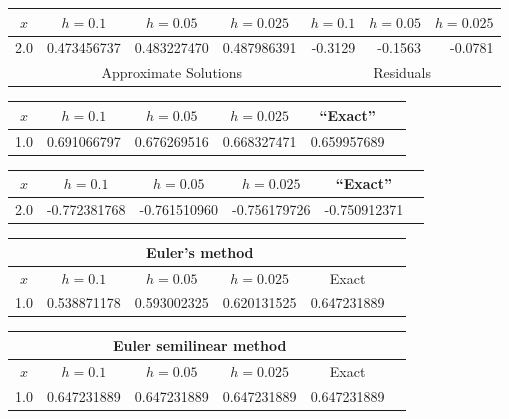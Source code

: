 \bigskip

 \quad
{\small
\begin{tabular}{|c|r|r|r|r|r|r|}\hline
\multicolumn{1}{|c|}{$x$}&
\multicolumn{1}{|c|}{$h=0.1$}&
\multicolumn{1}{|c|}{$h=0.05$}&
\multicolumn{1}{|c|}{$h=0.025$}&
\multicolumn{1}{|c|}{$h=0.1$}&
\multicolumn{1}{|c|}{$h=0.05$}&
\multicolumn{1}{|c|}{$h=0.025$}\\ \hline
2.0 & 0.473456737 & 0.483227470 & 0.487986391 &-0.3129 & -0.1563 & -0.0781 \\
\hline
&\multicolumn{3}{c|}{Approximate Solutions}&
\multicolumn{3}{c|}{Residuals}\\\hline
\end{tabular}}

\bigskip

     \quad
{\small
\begin{tabular}{|c|r|r|r|r|r|}
\hline
\multicolumn{1}{|c|}{$x$}&
\multicolumn{1}{|c|}{$h=0.1$}&
\multicolumn{1}{|c|}{$h=0.05$}&
\multicolumn{1}{|c|}{$h=0.025$}&
\multicolumn{1}{|c|}{``Exact''}\\ \hline
1.0 & 0.691066797 & 0.676269516 & 0.668327471 & 0.659957689 \\
\hline
\end{tabular}}

\bigskip
{}          \quad
{\small
\begin{tabular}{|c|r|r|r|r|r|}
\hline
\multicolumn{1}{|c|}{$x$}&
\multicolumn{1}{|c|}{$h=0.1$}&
\multicolumn{1}{|c|}{$h=0.05$}&
\multicolumn{1}{|c|}{$h=0.025$}&
\multicolumn{1}{|c|}{``Exact''}\\ \hline
2.0 & -0.772381768 & -0.761510960 & -0.756179726 & -0.750912371 \\
\hline
\end{tabular}}

\bigskip

{\small
\begin{tabular}{|c|r|r|r|r|r|}
\hline
\multicolumn{5}{|c|}{Euler's method}\\\hline
\multicolumn{1}{|c|}{$x$}&
\multicolumn{1}{|c|}{$h=0.1$}&
\multicolumn{1}{|c|}{$h=0.05$}&
\multicolumn{1}{|c|}{$h=0.025$}&
\multicolumn{1}{|c|}{Exact}\\ \hline
1.0 & 0.538871178 & 0.593002325 & 0.620131525 & 0.647231889 \\
\hline
\end{tabular}}

\bigskip

\hspace{.75in}
{\small
\begin{tabular}{|c|r|r|r|r|r|}
\hline
\multicolumn{5}{|c|}{Euler semilinear method}\\\hline
\multicolumn{1}{|c|}{$x$}&
\multicolumn{1}{|c|}{$h=0.1$}&
\multicolumn{1}{|c|}{$h=0.05$}&
\multicolumn{1}{|c|}{$h=0.025$}&
\multicolumn{1}{|c|}{Exact}\\ \hline
1.0 & 0.647231889 & 0.647231889 & 0.647231889 & 0.647231889 \\
\hline
\end{tabular}}

